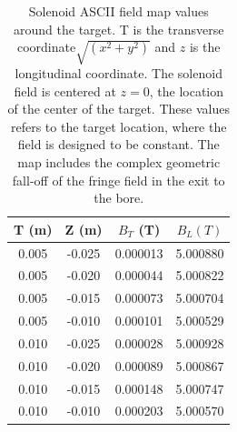 \begin{table}[h]
	\begin{center}
		\begin{tabular}{| c | c | c | c |}
			\hline \hline
			T (m)  & Z (m) &  $B_T$ (T) & $ B_L (T)$ \\
			\hline
          0.005  &  -0.025 & 0.000013  & 5.000880 \\
          0.005  &  -0.020 & 0.000044  & 5.000822 \\
          0.005  &  -0.015 & 0.000073  & 5.000704 \\
          0.005  &  -0.010 & 0.000101  & 5.000529 \\
          0.010  &  -0.025 & 0.000028  & 5.000928 \\
          0.010  &  -0.020 & 0.000089  & 5.000867 \\
          0.010  &  -0.015 & 0.000148  & 5.000747 \\
          0.010  &  -0.010 & 0.000203  & 5.000570 \\
		\hline \hline
		\end{tabular}
	\end{center}
\caption{Solenoid ASCII field map values around the target. T is the transverse coordinate$\sqrt{(x^2+y^2)}$ and
         $z$ is the longitudinal coordinate. The solenoid field is centered at $z=0$, the location of the center of the target.
  These values refers to the target location, where the field is designed to be constant. The map includes the
  complex geometric fall-off of the fringe field in the exit to the bore.}
\label{tab:solMap}
\end{table}

